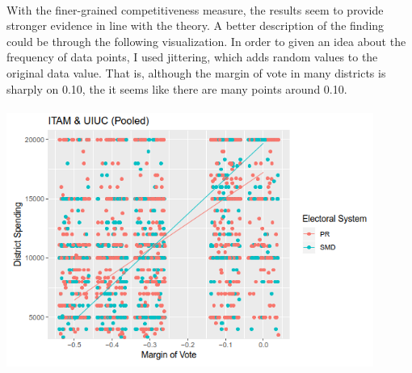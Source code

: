 \documentclass{article}
\begin{document}
\\
With the finer-grained competitiveness measure, the results seem to provide stronger evidence in line with the theory. A better description of the finding could be through the following visualization. In order to given an idea about the frequency of data points, I used jittering, which adds random values to the original data value. That is, although the margin of vote in many districts is sharply on 0.10, the it seems like there are many points around 0.10.\\
\\
\includegraphics[width=120mm]{Interactive_Pooled}
\end{document}
